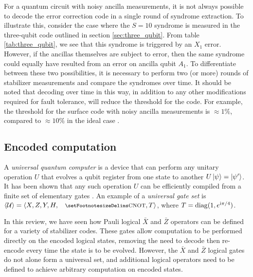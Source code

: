 \documentclass[]{arxiv}
\theoremstyle{plain}%
\theoremstyle{definition}
\theoremstyle{remark}
\newcommand{\cnoteq}{\leavevmode\hbox{\footnotesize{CNOT}}}
\begin{document}
For a quantum circuit with noisy ancilla measurements, it is not always possible to decode the error correction code in a single round of syndrome extraction. To illustrate this, consider  the case where the $S=10$ syndrome is measured in the three-qubit code outlined in section \ref{sec:three_qubit}. From table \ref{tab:three_qubit}, we see that this syndrome is triggered by an $X_1$ error. However, if the ancillas themselves are subject to error, then the same syndrome could equally have resulted from an error on ancilla qubit $A_1$. To differentiate between these two possibilities, it is necessary to perform two (or more) rounds of stabilizer measurements and compare the syndromes over time. It should be noted that decoding over time in this way, in addition to any other modifications required for fault tolerance, will reduce the threshold for the code. For example, the threshold for the surface code with noisy ancilla measurements is $\approx1\%$, compared to $\approx10\%$ in the ideal case \cite{Wang10,Fowler12}.

\subsection{Encoded computation}

A \textit{universal quantum computer} is a device that can perform any unitary operation $U$ that evolves a qubit register from one state to another $U\ket{\psi}=\ket{\psi'}$. It has been shown that any such operation $U$ can be efficiently compiled from a finite set of elementary gates \cite{Dawson05}. An example of a \textit{universal gate set} is $\langle \mathcal{U} \rangle=\langle  X, Z, Y, H, \cnoteq, T\rangle$, where $T={\rm diag} ( 1,e^{\rm i\pi/4} )$.

In this review, we have seen how Pauli logical $\bar{X}$ and $\bar{Z}$ operators can be defined for a variety of stabilizer codes. These gates allow computation to be performed directly on the encoded logical states, removing the need to decode then re-encode every time the state is to be evolved. However, the $\bar{X}$ and $\bar{Z}$ logical gates do not alone form a universal set, and additional logical operators need to be defined to achieve arbitrary computation on encoded states.
\end{document}
